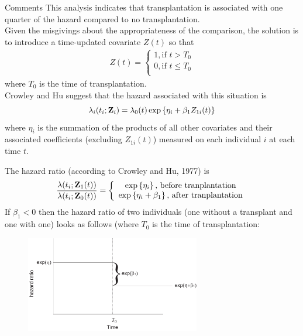 \documentclass[envcountsect, 10pt, portrait, palatino]{beamer}
\newcommand{\bfZ}{{\mbox{{\bf Z}}}}
\begin{document}
\begin{frame}{Comments}
This analysis indicates that transplantation is associated with one quarter of the hazard compared to no transplantation.\\[2ex]
Given the misgivings about the appropriateness of the comparison, the solution is to introduce a time-updated covariate $Z(t)$ so that
\begin{eqnarray*}
Z(t)=\left \{ \begin{array}{c}
  1,\mbox{if } t>T_0 \\
  0,\mbox{if } t\leq T_0\\
\end{array}\right .
\end{eqnarray*}
where $T_0$ is the time of transplantation.
\\[2ex]
Crowley and Hu suggest that the hazard associated with this situation is
$$
\lambda_i(t_i;\bfZ_i)=\lambda_0(t)\exp\left \{ \eta_i+\beta_1Z_{1i}(t)\right \}
$$
where $\eta_i$ is the summation of the products of all other covariates and their associated coefficients (excluding $Z_{1i}(t)$) measured on each individual $i$ at each time $t$.
\end{frame} 
\begin{frame}
The hazard ratio (according to Crowley and Hu, 1977) is
$$
\frac{\lambda(t_i;\bfZ_1(t))}{\lambda(t_i;\bfZ_0(t))}=\left \{ \begin{array}{c}
   \exp\left \{ \eta_i\right \}\mbox{, before tranplantation}\\
   \exp\left \{ \eta_i+\beta_1 \right \}\mbox{, after tranplantation}\\
\end{array}\right .
$$
If $\beta_1<0$ then the hazard ratio of two individuals (one without a transplant and one with one) looks as follows (where $T_0$ is the time of transplantation:
\begin{figure}[ht]
\centerline{\includegraphics[width=3in]{lect8_g2.pdf}}
\end{figure}
\end{frame} 
\end{document}
